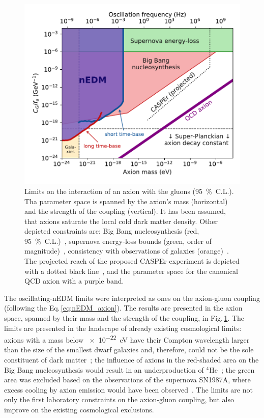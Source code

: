 \begin{figure}
  \centering
  \includegraphics[width=\linewidth]{gfx/axions/psi_ill_axion_limits_v7.pdf}
  \caption{Limits on the interaction of an axion with the gluons (\SI{95}{\percent}~C.L.). Tha parameter space is spanned by the axion's mass (horizontal) and the strength of the coupling (vertical). It has been assumed, that axions saturate the local cold dark matter density. Other depicted constraints are: Big Bang nucleosynthesis (red, \SI{95}{\percent}~C.L.)~\cite{Blum2014,StadnikThesis,Stadnik2015D}, supernova energy-loss bounds (green, order of magnitude)~\cite{Graham2013,Raffelt1990Review,Raffelt2008LNP}, consistency with observations of galaxies (orange)~\cite{Marsh2015Review,Marsh2015B,Schive2015,Marsh2017}. The projected reach of the proposed CASPEr experiment is depicted with a dotted black line~\cite{CASPEr2014}, and the parameter space for the canonical QCD axion with a purple band.}
\label{fig:axions_limits_coupling}
\end{figure}

The oscillating-nEDM limits were interpreted as ones on the axion-gluon coupling (following the Eq.\,\ref{eq:nEDM_axion}). The results are presented in the axion space, spanned by their mass and the strength of the coupling, in Fig.\,\ref{fig:axions_limits_coupling}. The limits are presented in the landscape of already existing cosmological limits: axions with a mass below \SI{e-22}{\electronvolt} have their Compton wavelength larger than the size of the smallest dwarf galaxies and, therefore, could not be the sole constituent of dark matter~\cite{Marsh2015Review}; the influence of axions in the red-shaded area on the Big Bang nucleosynthesis would result in an underproduction of ${}^4$He~\cite{Blum2014}; the green area was excluded based on the observations of the supernova SN1987A, where excess cooling by axion emission would have been observed~\cite{Graham2013}. The limits are not only the first laboratory constraints on the axion-gluon coupling, but also improve on the existing cosmological exclusions.




